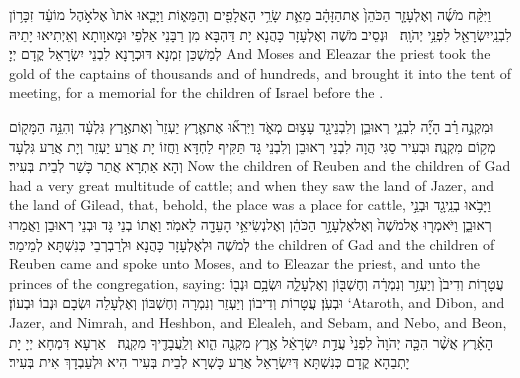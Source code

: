 {וַיִּקַּ֨ח מֹשֶׁ֜ה וְאֶלְעָזָ֤ר הַכֹּהֵן֙ אֶת\maqqaf הַזָּהָ֔ב מֵאֵ֛ת שָׂרֵ֥י הָאֲלָפִ֖ים וְהַמֵּא֑וֹת וַיָּבִ֤אוּ אֹתוֹ֙ אֶל\maqqaf אֹ֣הֶל מוֹעֵ֔ד זִכָּר֥וֹן לִבְנֵֽי\maqqaf יִשְׂרָאֵ֖ל לִפְנֵ֥י יְהֹוָֽה׃ \petucha }
{וּנְסֵיב מֹשֶׁה וְאֶלְעָזָר כָּהֲנָא יָת דַּהְבָּא מִן רַבָּנֵי אַלְפֵי וּמָאוָותָא וְאֵיְתִיאוּ יָתֵיהּ לְמַשְׁכַּן זִמְנָא דּוּכְרָנָא לִבְנֵי יִשְׂרָאֵל קֳדָם יְיָ׃}
{And Moses and Eleazar the priest took the gold of the captains of thousands and of hundreds, and brought it into the tent of meeting, for a memorial for the children of Israel before the \lord.}{}

\newperek
{}
{וּמִקְנֶ֣ה \legarmeh  רַ֗ב הָיָ֞ה לִבְנֵ֧י רְאוּבֵ֛ן וְלִבְנֵי\maqqaf גָ֖ד עָצ֣וּם מְאֹ֑ד וַיִּרְא֞וּ אֶת\maqqaf אֶ֤רֶץ יַעְזֵר֙ וְאֶת\maqqaf אֶ֣רֶץ גִּלְעָ֔ד וְהִנֵּ֥ה הַמָּק֖וֹם מְק֥וֹם מִקְנֶֽה׃}
{וּבְעִיר סַגִּי הֲוָה לִבְנֵי רְאוּבֵן וְלִבְנֵי גָּד תַּקִּיף לַחְדָּא וַחֲזוֹ יָת אֲרַע יַעְזֵר וְיָת אֲרַע גִּלְעָד וְהָא אַתְרָא אֲתַר כָּשַׁר לְבֵית בְּעִיר׃}
{Now the children of Reuben and the children of Gad had a very great multitude of cattle; and when they saw the land of Jazer, and the land of Gilead, that, behold, the place was a place for cattle,}{}
{וַיָּבֹ֥אוּ בְנֵֽי\maqqaf גָ֖ד וּבְנֵ֣י רְאוּבֵ֑ן וַיֹּאמְר֤וּ אֶל\maqqaf מֹשֶׁה֙ וְאֶל\maqqaf אֶלְעָזָ֣ר הַכֹּהֵ֔ן וְאֶל\maqqaf נְשִׂיאֵ֥י הָעֵדָ֖ה לֵאמֹֽר׃}
{וַאֲתוֹ בְנֵי גָּד וּבְנֵי רְאוּבֵן וַאֲמַרוּ לְמֹשֶׁה וּלְאֶלְעָזָר כָּהֲנָא וּלְרַבְרְבֵי כְּנִשְׁתָּא לְמֵימַר׃}
{the children of Gad and the children of Reuben came and spoke unto Moses, and to Eleazar the priest, and unto the princes of the congregation, saying:}{}
{עֲטָר֤וֹת וְדִיבֹן֙ וְיַעְזֵ֣ר וְנִמְרָ֔ה וְחֶשְׁבּ֖וֹן וְאֶלְעָלֵ֑ה וּשְׂבָ֥ם וּנְב֖וֹ וּבְעֹֽן׃}
{עֲטָרוֹת וְדִיבוֹן וְיַעְזֵר וְנִמְרָה וְחֶשְׁבּוֹן וְאֶלְעָלֵה וּשְׂבָם וּנְבוֹ וּבְעוֹן׃}
{‘Ataroth, and Dibon, and Jazer, and Nimrah, and Heshbon, and Elealeh, and Sebam, and Nebo, and Beon,}{}
{הָאָ֗רֶץ אֲשֶׁ֨ר הִכָּ֤ה יְהֹוָה֙ לִפְנֵי֙ עֲדַ֣ת יִשְׂרָאֵ֔ל אֶ֥רֶץ מִקְנֶ֖ה הִ֑וא וְלַֽעֲבָדֶ֖יךָ מִקְנֶֽה׃ \setuma }
{אַרְעָא דִּמְחָא יְיָ יָת יָתְבַהָא קֳדָם כְּנִשְׁתָּא דְּיִשְׂרָאֵל אֲרַע כָּשְׁרָא לְבֵית בְּעִיר הִיא וּלְעַבְדָךְ אִית בְּעִיר׃}
